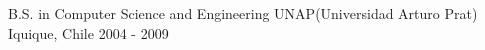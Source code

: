 

\begin{cventries}

  \cventry
    {B.S. in Computer Science and Engineering} %
    {UNAP(Universidad Arturo Prat)} %
    {Iquique, Chile} %
    {2004 - 2009} %
    {
      \begin{cvitems} %
      \end{cvitems}
    }

\end{cventries}
